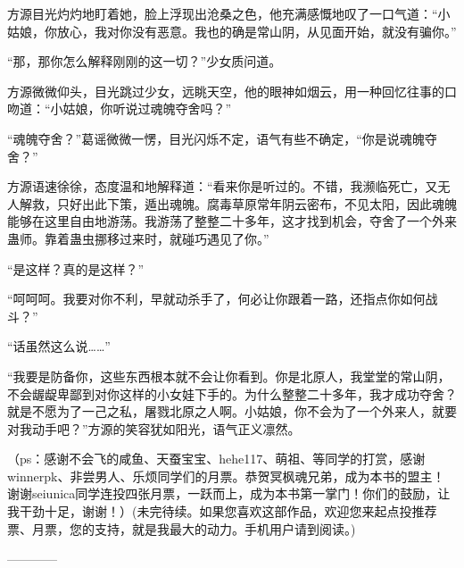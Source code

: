 \begin{this_body}
方源目光灼灼地盯着她，脸上浮现出沧桑之色，他充满感慨地叹了一口气道：“小姑娘，你放心，我对你没有恶意。我也的确是常山阴，从见面开始，就没有骗你。”

“那，那你怎么解释刚刚的这一切？”少女质问道。

方源微微仰头，目光跳过少女，远眺天空，他的眼神如烟云，用一种回忆往事的口吻道：“小姑娘，你听说过魂魄夺舍吗？”

“魂魄夺舍？”葛谣微微一愣，目光闪烁不定，语气有些不确定，“你是说魂魄夺舍？”

方源语速徐徐，态度温和地解释道：“看来你是听过的。不错，我濒临死亡，又无人解救，只好出此下策，遁出魂魄。腐毒草原常年阴云密布，不见太阳，因此魂魄能够在这里自由地游荡。我游荡了整整二十多年，这才找到机会，夺舍了一个外来蛊师。靠着蛊虫挪移过来时，就碰巧遇见了你。”

“是这样？真的是这样？”

“呵呵呵。我要对你不利，早就动杀手了，何必让你跟着一路，还指点你如何战斗？”

“话虽然这么说……”

“我要是防备你，这些东西根本就不会让你看到。你是北原人，我堂堂的常山阴，不会龌龊卑鄙到对你这样的小女娃下手的。为什么整整二十多年，我才成功夺舍？就是不愿为了一己之私，屠戮北原之人啊。小姑娘，你不会为了一个外来人，就要对我动手吧？”方源的笑容犹如阳光，语气正义凛然。

（ps：感谢不会飞的咸鱼、天蚕宝宝、hehe117、萌祖、等同学的打赏，感谢winnerpk、非尝男人、乐烦同学们的月票。恭贺冥枫魂兄弟，成为本书的盟主！谢谢seiunica同学连投四张月票，一跃而上，成为本书第一掌门！你们的鼓励，让我干劲十足，谢谢！）(未完待续。如果您喜欢这部作品，欢迎您来起点投推荐票、月票，您的支持，就是我最大的动力。手机用户请到阅读。)

------------

\end{this_body}

